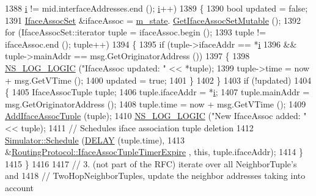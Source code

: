 \begin{DoxyCode}
1388        \hyperlink{bernuolliDistribution_8m_a6f6ccfcf58b31cb6412107d9d5281426}{i} != mid.interfaceAddresses.end (); \hyperlink{bernuolliDistribution_8m_a6f6ccfcf58b31cb6412107d9d5281426}{i}++)
1389     \{
1390       \textcolor{keywordtype}{bool} updated = \textcolor{keyword}{false};
1391       \hyperlink{namespacens3_1_1olsr_af7456b9ea2cde8c7d88443de06c015f4}{IfaceAssocSet} &ifaceAssoc = \hyperlink{classns3_1_1olsr_1_1RoutingProtocol_a07942ec1a7df71b609c8d2ff3b567c49}{m\_state}.
      \hyperlink{classns3_1_1olsr_1_1OlsrState_aff6a1f0bac684ac28ea0bed037cc7ef2}{GetIfaceAssocSetMutable} ();
1392       \textcolor{keywordflow}{for} (IfaceAssocSet::iterator tuple = ifaceAssoc.begin ();
1393            tuple != ifaceAssoc.end (); tuple++)
1394         \{
1395           \textcolor{keywordflow}{if} (tuple->ifaceAddr == *\hyperlink{bernuolliDistribution_8m_a6f6ccfcf58b31cb6412107d9d5281426}{i}
1396               && tuple->mainAddr == msg.GetOriginatorAddress ())
1397             \{
1398               \hyperlink{group__logging_ga88acd260151caf2db9c0fc84997f45ce}{NS\_LOG\_LOGIC} (\textcolor{stringliteral}{"IfaceAssoc updated: "} << *tuple);
1399               tuple->time = now + msg.GetVTime ();
1400               updated = \textcolor{keyword}{true};
1401             \}
1402         \}
1403       \textcolor{keywordflow}{if} (!updated)
1404         \{
1405           IfaceAssocTuple tuple;
1406           tuple.ifaceAddr = *\hyperlink{bernuolliDistribution_8m_a6f6ccfcf58b31cb6412107d9d5281426}{i};
1407           tuple.mainAddr = msg.GetOriginatorAddress ();
1408           tuple.time = now + msg.GetVTime ();
1409           \hyperlink{classns3_1_1olsr_1_1RoutingProtocol_a727294984dac11244bf1e92baa141934}{AddIfaceAssocTuple} (tuple);
1410           \hyperlink{group__logging_ga88acd260151caf2db9c0fc84997f45ce}{NS\_LOG\_LOGIC} (\textcolor{stringliteral}{"New IfaceAssoc added: "} << tuple);
1411           \textcolor{comment}{// Schedules iface association tuple deletion}
1412           \hyperlink{classns3_1_1Simulator_a671882c894a08af4a5e91181bf1eec13}{Simulator::Schedule} (\hyperlink{olsr-routing-protocol_8cc_ad0a00c3386c4a24278b3b710ae798220}{DELAY} (tuple.time),
1413                                &\hyperlink{classns3_1_1olsr_1_1RoutingProtocol_af93aa9d349c1be0aef8401d2e4189d4c}{RoutingProtocol::IfaceAssocTupleTimerExpire}
      , \textcolor{keyword}{this}, tuple.ifaceAddr);
1414         \}
1415     \}
1416 
1417   \textcolor{comment}{// 3. (not part of the RFC) iterate over all NeighborTuple's and}
1418   \textcolor{comment}{// TwoHopNeighborTuples, update the neighbor addresses taking into account}

\end{DoxyCode}
